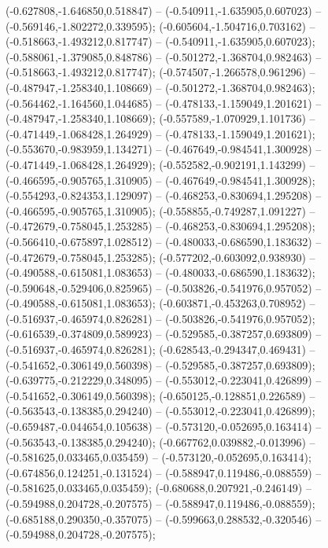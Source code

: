  (-0.627808,-1.646850,0.518847) -- (-0.540911,-1.635905,0.607023) -- (-0.569146,-1.802272,0.339595);
 (-0.605604,-1.504716,0.703162) -- (-0.518663,-1.493212,0.817747) -- (-0.540911,-1.635905,0.607023);
 (-0.588061,-1.379085,0.848786) -- (-0.501272,-1.368704,0.982463) -- (-0.518663,-1.493212,0.817747);
 (-0.574507,-1.266578,0.961296) -- (-0.487947,-1.258340,1.108669) -- (-0.501272,-1.368704,0.982463);
 (-0.564462,-1.164560,1.044685) -- (-0.478133,-1.159049,1.201621) -- (-0.487947,-1.258340,1.108669);
 (-0.557589,-1.070929,1.101736) -- (-0.471449,-1.068428,1.264929) -- (-0.478133,-1.159049,1.201621);
 (-0.553670,-0.983959,1.134271) -- (-0.467649,-0.984541,1.300928) -- (-0.471449,-1.068428,1.264929);
 (-0.552582,-0.902191,1.143299) -- (-0.466595,-0.905765,1.310905) -- (-0.467649,-0.984541,1.300928);
 (-0.554293,-0.824353,1.129097) -- (-0.468253,-0.830694,1.295208) -- (-0.466595,-0.905765,1.310905);
 (-0.558855,-0.749287,1.091227) -- (-0.472679,-0.758045,1.253285) -- (-0.468253,-0.830694,1.295208);
 (-0.566410,-0.675897,1.028512) -- (-0.480033,-0.686590,1.183632) -- (-0.472679,-0.758045,1.253285);
 (-0.577202,-0.603092,0.938930) -- (-0.490588,-0.615081,1.083653) -- (-0.480033,-0.686590,1.183632);
 (-0.590648,-0.529406,0.825965) -- (-0.503826,-0.541976,0.957052) -- (-0.490588,-0.615081,1.083653);
 (-0.603871,-0.453263,0.708952) -- (-0.516937,-0.465974,0.826281) -- (-0.503826,-0.541976,0.957052);
 (-0.616539,-0.374809,0.589923) -- (-0.529585,-0.387257,0.693809) -- (-0.516937,-0.465974,0.826281);
 (-0.628543,-0.294347,0.469431) -- (-0.541652,-0.306149,0.560398) -- (-0.529585,-0.387257,0.693809);
 (-0.639775,-0.212229,0.348095) -- (-0.553012,-0.223041,0.426899) -- (-0.541652,-0.306149,0.560398);
 (-0.650125,-0.128851,0.226589) -- (-0.563543,-0.138385,0.294240) -- (-0.553012,-0.223041,0.426899);
 (-0.659487,-0.044654,0.105638) -- (-0.573120,-0.052695,0.163414) -- (-0.563543,-0.138385,0.294240);
 (-0.667762,0.039882,-0.013996) -- (-0.581625,0.033465,0.035459) -- (-0.573120,-0.052695,0.163414);
 (-0.674856,0.124251,-0.131524) -- (-0.588947,0.119486,-0.088559) -- (-0.581625,0.033465,0.035459);
 (-0.680688,0.207921,-0.246149) -- (-0.594988,0.204728,-0.207575) -- (-0.588947,0.119486,-0.088559);
 (-0.685188,0.290350,-0.357075) -- (-0.599663,0.288532,-0.320546) -- (-0.594988,0.204728,-0.207575);
